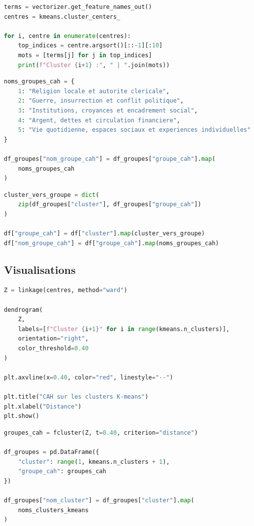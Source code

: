\begin{lstlisting}[language=Python, caption={Extraction des mots les plus représentatifs par cluster}]
terms = vectorizer.get_feature_names_out()
centres = kmeans.cluster_centers_

for i, centre in enumerate(centres):
    top_indices = centre.argsort()[::-1][:10]
    mots = [terms[j] for j in top_indices]
    print(f"Cluster {i+1} :", " | ".join(mots))
\end{lstlisting}
\begin{lstlisting}[language=Python, caption={Nomination des grandes familles de motifs}]
noms_groupes_cah = {
    1: "Religion locale et autorite clericale",
    2: "Guerre, insurrection et conflit politique",
    3: "Institutions, croyances et encadrement social",
    4: "Argent, dettes et circulation financiere",
    5: "Vie quotidienne, espaces sociaux et experiences individuelles"
}

df_groupes["nom_groupe_cah"] = df_groupes["groupe_cah"].map(
    noms_groupes_cah
)
\end{lstlisting}


\begin{lstlisting}[language=Python, caption={Attribution des groupes CAH aux segments du corpus}]
cluster_vers_groupe = dict(
    zip(df_groupes["cluster"], df_groupes["groupe_cah"])
)

df["groupe_cah"] = df["cluster"].map(cluster_vers_groupe)
df["nom_groupe_cah"] = df["groupe_cah"].map(noms_groupes_cah)
\end{lstlisting}

\subsection{Visualisations}

\begin{lstlisting}[language=Python, caption={Classification hiérarchique sur les centres des clusters}]
Z = linkage(centres, method="ward")

dendrogram(
    Z,
    labels=[f"Cluster {i+1}" for i in range(kmeans.n_clusters)],
    orientation="right",
    color_threshold=0.40
)

plt.axvline(x=0.40, color="red", linestyle="--")

plt.title("CAH sur les clusters K-means")
plt.xlabel("Distance")
plt.show()
\end{lstlisting}

\begin{lstlisting}[language=Python, caption={Création des groupes CAH à partir des clusters K-means}]
groupes_cah = fcluster(Z, t=0.40, criterion="distance")

df_groupes = pd.DataFrame({
    "cluster": range(1, kmeans.n_clusters + 1),
    "groupe_cah": groupes_cah
})

df_groupes["nom_cluster"] = df_groupes["cluster"].map(
    noms_clusters_kmeans
)
\end{lstlisting}

